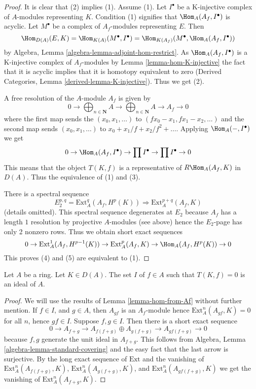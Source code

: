 \begin{proof}
It is clear that (2) implies (1). Assume (1).
Let $I^\bullet$ be a K-injective complex of $A$-modules representing $K$.
Condition (1) signifies that $\Hom_A(A_f, I^\bullet)$ is acyclic.
Let $M^\bullet$ be a complex of $A_f$-modules representing $E$.
Then
$$
\Hom_{D(A)}(E, K) =
\Hom_{K(A)}(M^\bullet, I^\bullet) =
\Hom_{K(A_f)}(M^\bullet, \Hom_A(A_f, I^\bullet))
$$
by Algebra, Lemma \ref{algebra-lemma-adjoint-hom-restrict}.
As $\Hom_A(A_f, I^\bullet)$ is a K-injective complex of
$A_f$-modules by Lemma \ref{lemma-hom-K-injective}
the fact that it is acyclic implies that it is homotopy equivalent to zero
(Derived Categories, Lemma \ref{derived-lemma-K-injective}).
Thus we get (2).

\medskip\noindent
A free resolution of the $A$-module $A_f$ is given by
$$
0 \to \bigoplus\nolimits_{n \in \mathbf{N}} A \to
\bigoplus\nolimits_{n \in \mathbf{N}} A
\to A_f \to 0
$$
where the first map sends the $(x_0, x_1, \ldots)$ to
$(fx_0 - x_1, fx_1 - x_2, \ldots)$ and the second map sends
$(x_0, x_1, \ldots)$ to $x_0 + x_1/f + x_2/f^2 + \ldots$.
Applying $\Hom_A(-, I^\bullet)$ we get
$$
0 \to \Hom_A(A_f, I^\bullet) \to \prod I^\bullet \to \prod I^\bullet \to 0
$$
This means that the object $T(K, f)$ is a representative of
$R\Hom_A(A_f, K)$ in $D(A)$. Thus the equivalence of (1) and (3).

\medskip\noindent
There is a spectral sequence
$$
E_2^{p, q} = \text{Ext}^q_A(A_f, H^p(K)) \Rightarrow
\text{Ext}^{p + q}_A(A_f, K)
$$
(details omitted). This spectral sequence degenerates at $E_2$ because
$A_f$ has a length $1$ resolution by projective $A$-modules (see above)
hence the $E_2$-page has only 2 nonzero rows. Thus we obtain short exact
sequences
$$
0 \to \text{Ext}^1_A(A_f, H^{p - 1}(K)) \to \text{Ext}^p_A(A_f, K)
\to \Hom_A(A_f, H^p(K)) \to 0
$$
This proves (4) and (5) are equivalent to (1).
\end{proof}

\begin{lemma}
\label{lemma-ideal-of-elements-complete-wrt}
Let $A$ be a ring. Let $K \in D(A)$. The set $I$ of $f \in A$ such that
$T(K, f) = 0$ is an ideal of $A$.
\end{lemma}

\begin{proof}
We will use the results of Lemma \ref{lemma-hom-from-Af}
without further mention.
If $f \in I$, and $g \in A$, then $A_{gf}$ is an $A_f$-module
hence $\text{Ext}^n_A(A_{gf}, K) = 0$ for all $n$, hence $gf \in I$.
Suppose $f, g \in I$. Then there is a short exact sequence
$$
0 \to A_{f + g} \to A_{f(f + g)} \oplus A_{g(f + g)} \to A_{gf(f + g)} \to 0
$$
because $f, g$ generate the unit ideal in $A_{f + g}$. This follows from
Algebra, Lemma \ref{algebra-lemma-standard-covering}
and the easy fact that the last arrow is surjective.
By the long exact sequence of $\text{Ext}$
and the vanishing of
$\text{Ext}^n_A(A_{f(f + g)}, K)$,
$\text{Ext}^n_A(A_{g(f + g)}, K)$, and
$\text{Ext}^n_A(A_{gf(f + g)}, K)$
we get the vanishing of 
$\text{Ext}^n_A(A_{f + g}, K)$.
\end{proof}

